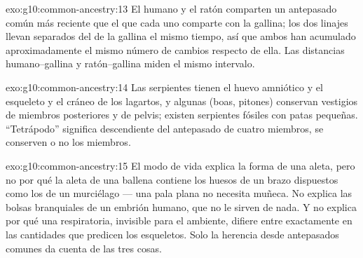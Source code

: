 \begin{solution}{exo:g10:common-ancestry:13}
El humano y el ratón comparten un antepasado común más reciente que el
que cada uno comparte con la gallina; los dos linajes llevan separados
del de la gallina el mismo tiempo, así que ambos han acumulado
aproximadamente el mismo número de cambios respecto de ella. Las
distancias humano--gallina y ratón--gallina miden el mismo intervalo.
\end{solution}

\begin{solution}{exo:g10:common-ancestry:14}
Las serpientes tienen el huevo amniótico y el esqueleto y el cráneo de
los lagartos, y algunas (boas, pitones) conservan vestigios de miembros
posteriores y de pelvis; existen serpientes fósiles con patas
pequeñas. ``Tetrápodo'' significa descendiente del antepasado de cuatro
miembros, se conserven o no los miembros.
\end{solution}

\begin{solution}{exo:g10:common-ancestry:15}
El modo de vida explica la forma de una aleta, pero no por qué la
aleta de una ballena contiene los huesos de un brazo dispuestos como
los de un murciélago --- una pala plana no necesita muñeca. No explica
las bolsas branquiales de un embrión humano, que no le sirven de nada.
Y no explica por qué una  respiratoria, invisible para el
ambiente, difiere entre  exactamente en las cantidades que
predicen los esqueletos. Solo la herencia desde antepasados comunes da
cuenta de las tres cosas.
\end{solution}

